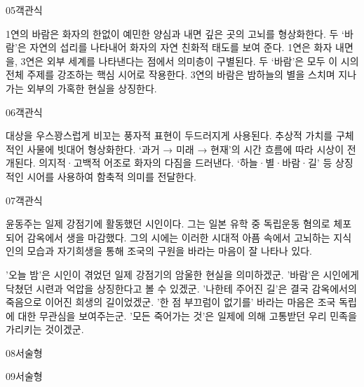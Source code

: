 \documentclass[fs9,seriesRus]{korfarm-base}
\begin{document}
\begin{kfQBlock}{05}{객관식}
\begin{kfChoices}
\kfChoice 1연의 바람은 화자의 한없이 예민한 양심과 내면 깊은 곳의 고뇌를 형상화한다.
\kfChoice 두 ‘바람’은 자연의 섭리를 나타내어 화자의 자연 친화적 태도를 보여 준다.
\kfChoice 1연은 화자 내면을, 3연은 외부 세계를 나타낸다는 점에서 의미층이 구별된다.
\kfChoice 두 ‘바람’은 모두 이 시의 전체 주제를 강조하는 핵심 시어로 작용한다.
\kfChoice 3연의 바람은 밤하늘의 별을 스치며 지나가는 외부의 가혹한 현실을 상징한다.
\end{kfChoices}
\end{kfQBlock}
\begin{kfQBlock}{06}{객관식}
\begin{kfChoices}
\kfChoice 대상을 우스꽝스럽게 비꼬는 풍자적 표현이 두드러지게 사용된다.
\kfChoice 추상적 가치를 구체적인 사물에 빗대어 형상화한다.
\kfChoice ‘과거 → 미래 → 현재’의 시간 흐름에 따라 시상이 전개된다.
\kfChoice 의지적·고백적 어조로 화자의 다짐을 드러낸다.
\kfChoice ‘하늘·별·바람·길’ 등 상징적인 시어를 사용하여 함축적 의미를 전달한다.
\end{kfChoices}
\end{kfQBlock}
\begin{kfQBlock}{07}{객관식}
\begin{kfEvidence}윤동주는 일제 강점기에 활동했던 시인이다. 그는 일본 유학 중 독립운동 혐의로 체포되어 감옥에서 생을 마감했다. 그의 시에는 이러한 시대적 아픔 속에서 고뇌하는 지식인의 모습과 자기희생을 통해 조국의 구원을 바라는 마음이 잘 나타나 있다.\end{kfEvidence}
\begin{kfChoices}
\kfChoice '오늘 밤'은 시인이 겪었던 일제 강점기의 암울한 현실을 의미하겠군.
\kfChoice '바람'은 시인에게 닥쳤던 시련과 억압을 상징한다고 볼 수 있겠군.
\kfChoice '나한테 주어진 길'은 결국 감옥에서의 죽음으로 이어진 희생의 길이었겠군.
\kfChoice '한 점 부끄럼이 없기를' 바라는 마음은 조국 독립에 대한 무관심을 보여주는군.
\kfChoice '모든 죽어가는 것'은 일제에 의해 고통받던 우리 민족을 가리키는 것이겠군.
\end{kfChoices}
\end{kfQBlock}
\begin{kfQBlock}{08}{서술형}
\end{kfQBlock}
\begin{kfQBlock}{09}{서술형}
\end{kfQBlock}
\kfEndMC
\end{document}
